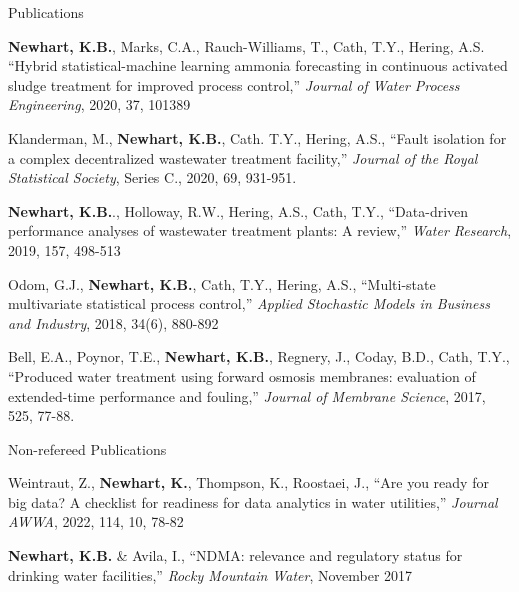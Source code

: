 \documentclass{resume} %
\begin{document}
\begin{rSection}{Publications}
\begin{etaremune}
	\item \textbf{Newhart, K.B.}, Marks, C.A., Rauch-Williams, T., Cath, T.Y., Hering, A.S. ``Hybrid statistical-machine learning ammonia forecasting in continuous activated sludge treatment for improved process control,'' \emph{Journal of Water Process Engineering}, 2020, 37, 101389

	\item Klanderman, M., \textbf{Newhart, K.B.}, Cath. T.Y., Hering, A.S., ``Fault isolation for a complex decentralized wastewater treatment facility,'' \emph{Journal of the Royal Statistical Society}, Series C., 2020, 69, 931-951.

	\item \textbf{Newhart, K.B.}., Holloway, R.W., Hering, A.S., Cath, T.Y., ``Data-driven performance analyses of wastewater treatment plants: A review,'' \emph{Water Research}, 2019, 157, 498-513

	\item Odom, G.J., \textbf{Newhart, K.B.}, Cath, T.Y., Hering, A.S., ``Multi-state multivariate statistical process control,'' \emph{Applied Stochastic Models in Business and Industry}, 2018, 34(6), 880-892

	\item Bell, E.A., Poynor, T.E., \textbf{Newhart, K.B.}, Regnery, J., Coday, B.D., Cath, T.Y., ``Produced water treatment using forward osmosis membranes: evaluation of extended-time performance and fouling,'' \emph{Journal of Membrane Science}, 2017, 525, 77-88.
\end{etaremune}

\end{rSection}


\begin{rSection}{Non-refereed Publications}

Weintraut, Z., \textbf{Newhart, K.}, Thompson, K., Roostaei, J., ``Are you ready for big data? A checklist for readiness for data analytics in water utilities,'' \emph{Journal AWWA}, 2022, 114, 10, 78-82

\textbf{Newhart, K.B.} \& Avila, I., ``NDMA: relevance and regulatory status for drinking water facilities,'' \emph{Rocky Mountain Water}, November 2017

\end{rSection}
\end{document}

